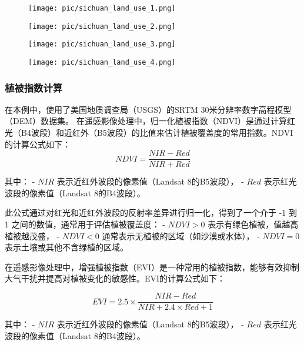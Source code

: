 \documentclass{article}
\begin{document}
		
		
		\begin{figure}[H]  %
			\centering
			\texttt{[image: pic/sichuan\_land\_use\_1.png]} %
		\end{figure}
		\begin{figure}[H]  %
			\centering
			\texttt{[image: pic/sichuan\_land\_use\_2.png]} %
		\end{figure}
		\begin{figure}[H]  %
			\centering
			\texttt{[image: pic/sichuan\_land\_use\_3.png]} %
		\end{figure}
		\begin{figure}[H]  %
			\centering
			\texttt{[image: pic/sichuan\_land\_use\_4.png]} %
		\end{figure}
		\subsubsection{植被指数计算}
		
				
		在本例中，使用了美国地质调查局（USGS）的SRTM 30米分辨率数字高程模型（DEM）数据集。
		在遥感影像处理中，归一化植被指数（NDVI）是通过计算红光（B4波段）和近红外（B5波段）的比值来估计植被覆盖度的常用指数。NDVI的计算公式如下：
		\[
		NDVI = \frac{NIR - Red}{NIR + Red}
		\]
		
		其中：
		- \( NIR \) 表示近红外波段的像素值（Landsat 8的B5波段），
		- \( Red \) 表示红光波段的像素值（Landsat 8的B4波段）。
		
		此公式通过对红光和近红外波段的反射率差异进行归一化，得到了一个介于 -1 到 1 之间的数值，通常用于评估植被覆盖度：
		- \( NDVI > 0 \) 表示有绿色植被，值越高植被越茂盛，
		- \( NDVI < 0 \) 通常表示无植被的区域（如沙漠或水体），
		- \( NDVI = 0 \) 表示土壤或其他不含绿植的区域。
		
		在遥感影像处理中，增强植被指数（EVI）是一种常用的植被指数，能够有效抑制大气干扰并提高对植被变化的敏感性。EVI的计算公式如下：
		
		\[
		EVI = 2.5 \times \frac{NIR - Red}{NIR + 2.4 \times Red + 1}
		\]
		
		其中：
		- \( NIR \) 表示近红外波段的像素值（Landsat 8的B5波段），
		- \( Red \) 表示红光波段的像素值（Landsat 8的B4波段）。
		
\end{document}
